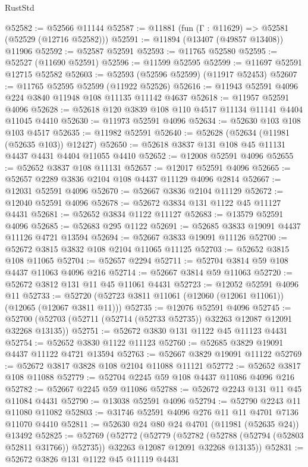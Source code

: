 \begin{lexlean}{RustStd}
\begin{coremodule}
@52582 := @52566 @11144
@52587 := @11881 (fun (Γ : @11629) => @52581 (@52529 (@12716 @52582)))
@52591 := @11894 (@13407 (@49857 @13408)) @11906
@52592 := @52587 @52591
@52593 := @11765 @52580
@52595 := @52527 (@11690 @52591)
@52596 := @11599 @52595
@52599 := @11697 @52591 @12715 @52582
@52603 := @52593 (@52596 @52599) (@11917 @52453)
@52607 := @11765 @52595 @52599 (@11922 @52526)
@52616 := @11943 @52591 @4096 @224 @3840 @11948 @108 @11135 @11142 @4637
@52618 := @11957 @52591 @4096
@52628 := @52618 @120 @3839 @108 @110 @4517 @11134 @11141 @4404 @11045 @4410
@52630 := @11973 @52591 @4096
@52634 := @52630 @103 @108 @103 @4517
@52635 := @11982 @52591
@52640 := @52628 (@52634 (@11981 (@52635 @103)) @12427)
@52650 := @52618 @3837 @131 @108 @45 @11131 @4437 @4431 @4404 @11055 @4410
@52652 := @12008 @52591 @4096
@52655 := @52652 @3837 @108 @11131
@52657 := @12017 @52591 @4096
@52665 := @52657 @2289 @3836 @2104 @108 @4437 @11129 @4096 @2814
@52667 := @12031 @52591 @4096
@52670 := @52667 @3836 @2104 @11129
@52672 := @12040 @52591 @4096
@52678 := @52672 @3834 @131 @1122 @45 @11127 @4431
@52681 := @52652 @3834 @1122 @11127
@52683 := @13579 @52591 @4096
@52685 := @52683 @295 @1122
@52691 := @52685 @3833 @19091 @4437 @11126 @4721 @13594
@52694 := @52667 @3833 @19091 @11126
@52700 := @52672 @3815 @3832 @108 @2104 @11065 @11125
@52703 := @52652 @3815 @108 @11065
@52704 := @52657 @2294
@52711 := @52704 @3814 @59 @108 @4437 @11063 @4096 @216
@52714 := @52667 @3814 @59 @11063
@52720 := @52672 @3812 @131 @11 @45 @11061 @4431
@52723 := @12052 @52591 @4096 @11
@52733 := @52720 (@52723 @3811 @11061 (@12060 (@12061 @11061)) (@12065 (@12067 @3811 @11)))
@52735 := @12076 @52591 @4096
@52745 := @52700 (@52703 (@52711 (@52714 (@52733 @52735)) @32263 @12087 @12091 @32268 @13135))
@52751 := @52672 @3830 @131 @1122 @45 @11123 @4431
@52754 := @52652 @3830 @1122 @11123
@52760 := @52685 @3829 @19091 @4437 @11122 @4721 @13594
@52763 := @52667 @3829 @19091 @11122
@52769 := @52672 @3817 @3828 @108 @2104 @11088 @11121
@52772 := @52652 @3817 @108 @11088
@52779 := @52704 @2245 @59 @108 @4437 @11086 @4096 @216
@52782 := @52667 @2245 @59 @11086
@52788 := @52672 @2243 @131 @11 @45 @11084 @4431
@52790 := @13038 @52591 @4096
@52794 := @52790 @2243 @11 @11080 @11082
@52803 := @31746 @52591 @4096 @276 @11 @11 @4701 @7136 @11070 @4410
@52811 := @52630 @24 @80 @24 @4701 (@11981 (@52635 @24)) @13492
@52825 := @52769
    (@52772
      (@52779
        (@52782 (@52788 (@52794 (@52803 @52811 @31766)) @52735))
        @32263
        @12087
        @12091
        @32268
        @13135))
@52831 := @52672 @3826 @131 @1122 @45 @11119 @4431

\end{coremodule}
\end{lexlean}
